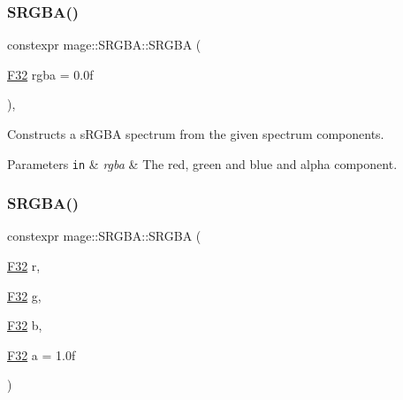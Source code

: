 \subsubsection{\texorpdfstring{S\+R\+G\+B\+A()}{SRGBA()}\hspace{0.1cm}{\footnotesize\ttfamily [1/7]}}
{\footnotesize\ttfamily constexpr mage\+::\+S\+R\+G\+B\+A\+::\+S\+R\+G\+BA (\begin{DoxyParamCaption}\item[{\mbox{\hyperlink{namespacemage_aa97e833b45f06d60a0a9c4fc22ae02c0}{F32}}}]{rgba = {\ttfamily 0.0f} }\end{DoxyParamCaption})\hspace{0.3cm}{\ttfamily [explicit]}, {\ttfamily [noexcept]}}

Constructs a s\+R\+G\+BA spectrum from the given spectrum components.


\begin{DoxyParams}[1]{Parameters}
\mbox{\tt in}  & {\em rgba} & The red, green and blue and alpha component. \\
\hline
\end{DoxyParams}
\mbox{\label{structmage_1_1_s_r_g_b_a_a159096e69a7e18eee0d6718d244a1493}} 
\subsubsection{\texorpdfstring{S\+R\+G\+B\+A()}{SRGBA()}\hspace{0.1cm}{\footnotesize\ttfamily [2/7]}}
{\footnotesize\ttfamily constexpr mage\+::\+S\+R\+G\+B\+A\+::\+S\+R\+G\+BA (\begin{DoxyParamCaption}\item[{\mbox{\hyperlink{namespacemage_aa97e833b45f06d60a0a9c4fc22ae02c0}{F32}}}]{r,  }\item[{\mbox{\hyperlink{namespacemage_aa97e833b45f06d60a0a9c4fc22ae02c0}{F32}}}]{g,  }\item[{\mbox{\hyperlink{namespacemage_aa97e833b45f06d60a0a9c4fc22ae02c0}{F32}}}]{b,  }\item[{\mbox{\hyperlink{namespacemage_aa97e833b45f06d60a0a9c4fc22ae02c0}{F32}}}]{a = {\ttfamily 1.0f} }\end{DoxyParamCaption})\hspace{0.3cm}{\ttfamily [noexcept]}}

